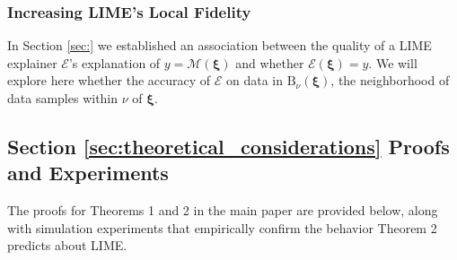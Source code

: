 \documentclass[mnsc,blindrev]{informs3}
\begin{document}
        
    
        
            
   
    
 
    

        \subsubsection{Increasing LIME's Local Fidelity}
            In Section \ref{sec:} we established an association between the quality of a LIME explainer $\mathcal{E}$'s explanation of $y=\mathcal{M}(\boldsymbol{\xi})$ and whether $\mathcal{E}(\boldsymbol{\xi}) = y$. We will explore here whether the accuracy of $\mathcal{E}$ on data in $\text{B}_\nu(\boldsymbol{\xi})$, the neighborhood of data samples within $\nu$ of $\boldsymbol{\xi}$. 



    \subsection{Section \ref{sec:theoretical_considerations} Proofs and Experiments}    
        The proofs for Theorems 1 and 2 in the main paper are provided below, along with simulation experiments that empirically confirm the behavior Theorem 2 predicts about LIME. 
        
\end{document}
